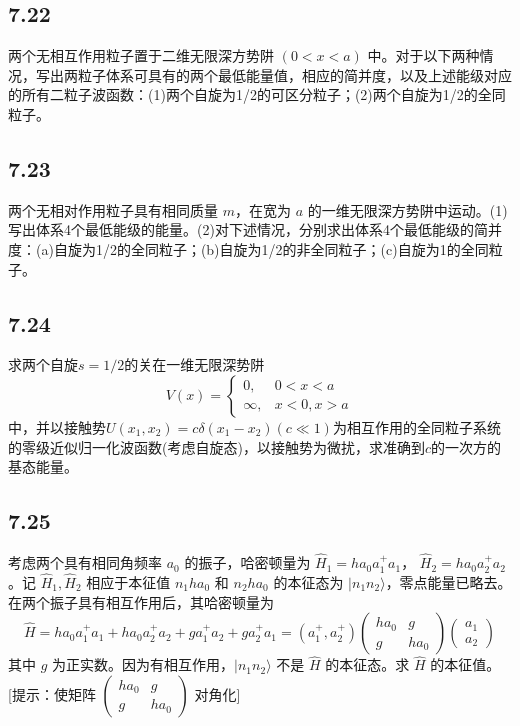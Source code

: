 \subsection{7.22}
两个无相互作用粒子置于二维无限深方势阱 $(0 < x < a)$ 中。对于以下两种情况，写出两粒子体系可具有的两个最低能量值，相应的简并度，以及上述能级对应的所有二粒子波函数：(1)两个自旋为1/2的可区分粒子；(2)两个自旋为1/2的全同粒子。

\subsection{7.23}
两个无相对作用粒子具有相同质量 $m$，在宽为 $a$ 的一维无限深方势阱中运动。(1)写出体系4个最低能级的能量。(2)对下述情况，分别求出体系4个最低能级的简并度：(a)自旋为1/2的全同粒子；(b)自旋为1/2的非全同粒子；(c)自旋为1的全同粒子。

\subsection{7.24}
求两个自旋$s=1/2$的关在一维无限深势阱$$V(x)= \begin{cases} 0, & 0<x<a \\ \infty, & x<0,x>a \end{cases}$$中，并以接触势$U(x_1,x_2)=c\delta(x_1-x_2)(c\ll 1)$为相互作用的全同粒子系统的零级近似归一化波函数(考虑自旋态)，以接触势为微扰，求准确到$c$的一次方的基态能量。

\subsection{7.25}
考虑两个具有相同角频率 $a_0$ 的振子，哈密顿量为 $\hat{H}_1 = ha_0 a_1^+ a_1$， $\hat{H}_2 = ha_0 a_2^+ a_2$。记 $\hat{H}_1, \hat{H}_2$ 相应于本征值 $n_1 ha_0$ 和 $n_2 ha_0$ 的本征态为 $|n_1 n_2\rangle$，零点能量已略去。在两个振子具有相互作用后，其哈密顿量为 $$\hat{H} = ha_0 a_1^+ a_1 + ha_0 a_2^+ a_2 + ga_1^+ a_2 + ga_2^+ a_1 = (a_1^+, a_2^+) \begin{pmatrix} ha_0 & g \\ g & ha_0 \end{pmatrix} \begin{pmatrix} a_1 \\ a_2 \end{pmatrix}$$ 其中 $g$ 为正实数。因为有相互作用，$|n_1 n_2\rangle$ 不是 $\hat{H}$ 的本征态。求 $\hat{H}$ 的本征值。[提示：使矩阵 $\begin{pmatrix} ha_0 & g \\ g & ha_0 \end{pmatrix}$ 对角化]

